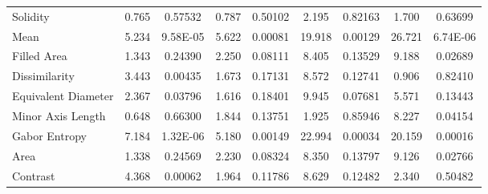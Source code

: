 \documentclass{article}
\begin{document}
\begin{table}[ht!]
{\begin{tabular}{lcccccccc}
        Solidity & 0.765 & 0.57532 & 0.787 & 0.50102 & 2.195 & 0.82163 & 1.700 & 0.63699 \\ 
        Mean & 5.234 & 9.58E-05 & 5.622 & 0.00081 & 19.918 & 0.00129 & 26.721 & 6.74E-06 \\ 
        Filled Area & 1.343 & 0.24390 & 2.250 & 0.08111 & 8.405 & 0.13529 & 9.188 & 0.02689 \\ 
        Dissimilarity & 3.443 & 0.00435 & 1.673 & 0.17131 & 8.572 & 0.12741 & 0.906 & 0.82410 \\ 
        Equivalent Diameter & 2.367 & 0.03796 & 1.616 & 0.18401 & 9.945 & 0.07681 & 5.571 & 0.13443 \\ 
        Minor Axis Length & 0.648 & 0.66300 & 1.844 & 0.13751 & 1.925 & 0.85946 & 8.227 & 0.04154 \\ 
        Gabor Entropy & 7.184 & 1.32E-06 & 5.180 & 0.00149 & 22.994 & 0.00034 & 20.159 & 0.00016 \\ 
        Area & 1.338 & 0.24569 & 2.230 & 0.08324 & 8.350 & 0.13797 & 9.126 & 0.02766 \\ 
        Contrast & 4.368 & 0.00062 & 1.964 & 0.11786 & 8.629 & 0.12482 & 2.340 & 0.50482 \\ 
        \hline
    \end{tabular}%
    }
\end{table}
\end{document}
